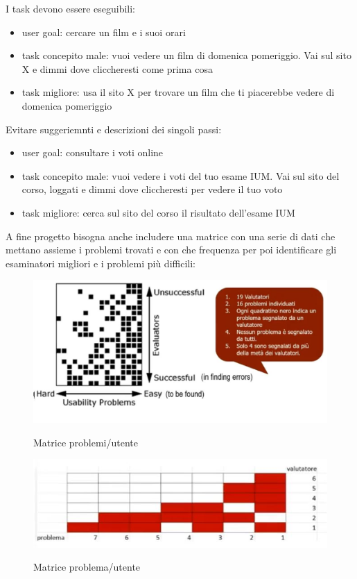 \documentclass[11pt,a4paper]{book}
\begin{document}
I task devono essere eseguibili:
\begin{itemize}
	\item user goal: cercare un film e i suoi orari
	\item task concepito male: vuoi vedere un film di domenica pomeriggio. Vai sul sito X e dimmi dove cliccheresti come prima cosa
	\item task migliore: usa il sito X per trovare un film che ti piacerebbe vedere di domenica pomeriggio
\end{itemize}

Evitare suggeriemnti e descrizioni dei singoli passi:
\begin{itemize}
	\item user goal: consultare i voti online
	\item task concepito male: vuoi vedere i voti del tuo esame IUM. Vai sul sito del corso, loggati e dimmi dove cliccheresti per vedere il tuo voto
	\item task migliore: cerca sul sito del corso il risultato dell'esame IUM
\end{itemize}

A fine progetto bisogna anche includere una matrice con una serie di dati che mettano assieme i problemi trovati e con che frequenza per poi identificare gli esaminatori migliori e i problemi più difficili:
\begin{figure}[h!]
	\begin{center}
		\includegraphics[scale=0.6]{img/014.jpg}
		\caption{Matrice problemi/utente}
		\label{fig: 014}
		\includegraphics[scale=0.6]{img/015.jpg}
		\caption{Matrice problema/utente}
		\label{fig: 015}
	\end{center}
\end{figure}
\end{document}
